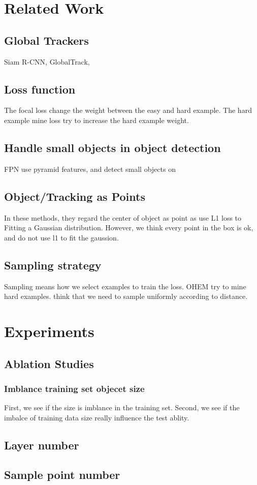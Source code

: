 \documentclass[11pt,a4paper]{article}
\begin{document}
\section{Related Work}
\subsection{Global Trackers} Siam R-CNN, GlobalTrack, 
\subsection{Loss function} The focal loss change the weight between the easy and hard example. The hard example mine loss try to increase the hard example weight.
\subsection{Handle small objects in object detection}
FPN use pyramid features, and detect small objects on 
\subsection{Object/Tracking as Points} In these methods, they regard the center of object as point as use L1 loss to Fitting a Gaussian distribution. However, we think every point in the box is ok, and do not use l1 to fit the gaussion.
\subsection{Sampling strategy} Sampling means how we select examples to train the loss. OHEM try to mine hard examples. \cite{wu2017sampling} think that we need to sample uniformly according to distance.
\section{Experiments}
\subsection{Ablation Studies}
\subsubsection{Imblance training set objecet size}
First, we see if the size is imblance in the training set.
Second, we see if the imbalce of training data size really influence the test ablity.
\subsection{Layer number}
\subsection{Sample point number}
\newpage


\end{document}
